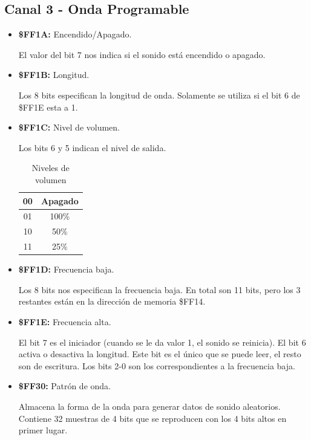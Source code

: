 \subsection{Canal 3 - Onda Programable}
	
	\begin{itemize}
		\item \textbf{\$FF1A:} Encendido/Apagado.
		
		El valor del bit 7 nos indica si el sonido está encendido o apagado.		
		
		\item \textbf{\$FF1B:} Longitud.
		
		Los 8 bits especifican la longitud de onda. Solamente se utiliza si el bit 6 de \$FF1E esta a 1.		
		
		\item \textbf{\$FF1C:} Nivel de volumen.
		
		Los bits 6 y 5 indican el nivel de salida.
		
		\begin{table}[h!]
			\centering
			\begin{tabular}{|c|l|l|l|c|}
				\hline
				\multicolumn{4}{|c|}{00}       & Apagado								\\ \hline
				\multicolumn{4}{|c|}{01}       & 100\% 									\\ \hline
				\multicolumn{4}{|c|}{10}       & 50\% 									\\ \hline
				\multicolumn{4}{|c|}{11}       & 25\%
				\\ \hline
			\end{tabular}
			\caption{Niveles de volumen}
			\label{table:vol}
		\end{table} 
		
		\item \textbf{\$FF1D:} Frecuencia baja.
		
		Los 8 bits nos especifican la frecuencia baja. En total son 11 bits, pero los 3 restantes están en la dirección de memoria \$FF14.		
		
		\item \textbf{\$FF1E:} Frecuencia alta.
	
		El bit 7 es el iniciador (cuando se le da valor 1, el sonido se reinicia). El bit 6 activa o desactiva la longitud. Este bit es el único que se puede leer, el resto son de escritura. Los bits 2-0 son los correspondientes a la frecuencia baja.		
		
		\item \textbf{\$FF30:} Patrón de onda.
		
		Almacena la forma de la onda para generar datos de sonido aleatorios. Contiene 32 muestras de 4 bits que se reproducen con los 4 bits altos en primer lugar.		
		
	\end{itemize}
	
